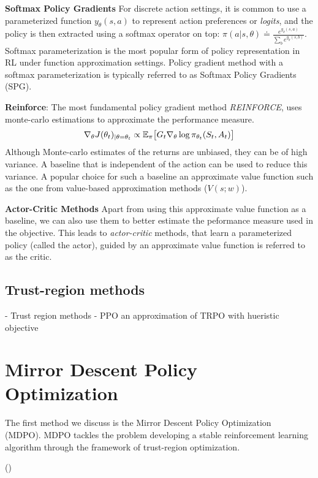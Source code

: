 \textbf{Softmax Policy Gradients}
For discrete action settings, it is common to use a parameterized function $y_\theta(s, a)$ to
represent action preferences or \textit{logits}, and the policy is then extracted using a softmax
operator on top: $\pi(a|s, \theta) \doteq \frac{e^{y_\theta(s, a)}}{\sum_b e^{y_\theta(s,b)}}$.
Softmax parameterization is the most popular form of policy representation in RL under function
approximation settings.
Policy gradient method with a softmax parameterization is typically referred to as Softmax Policy
Gradients (SPG).

\textbf{Reinforce}:
The most fundamental policy gradient method \textit{REINFORCE}, uses monte-carlo estimations to approximate
the performance measure.
\begin{equation}
	\label{eqn:reinforce}
	\nabla_\theta J(\theta_t)_{|\theta=\theta_t} \propto \mathbb{E}_\pi \big[ G_t \nabla_\theta \log \pi_{\theta_t}(S_t, A_t) \big]
\end{equation}
Although Monte-carlo estimates of the returns are unbiased, they can be of high variance.
A baseline that is independent of the action can be used to reduce this variance.
A popular choice for such a baseline an approximate value function such as the one from value-based
approximation methods ($V(s;w)$).

\textbf{Actor-Critic Methods}
Apart from using this approximate value function as a baseline, we can also use them to better
estimate the peformance measure used in the objective.
This leads to \textit{actor-critic} methods, that learn a parameterized policy (called the actor),
guided by an approximate value function is referred to as the critic.

\subsection{Trust-region methods}
- Trust region methods
- PPO an approximation of TRPO with hueristic objective

\section[MDPO]{Mirror Descent Policy Optimization}

The first method we discuss is the Mirror Descent Policy Optimization~\cite{tomarMirror2022}
(MDPO).
MDPO tackles the problem developing a stable reinforcement learning algorithm through the framework
of trust-region optimization.

()

